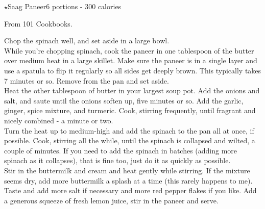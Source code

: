 \begin{recipe}{\texorpdfstring{$\star$}{str}Saag Paneer}{6 portions - 300 calories}{}

\freeform From 101 Cookbooks.


Chop the spinach well, and set aside in a large bowl.\\

While you're chopping spinach, cook the paneer in one tablespoon of the butter over medium heat in a large skillet. Make sure the paneer is in a single layer and use a spatula to flip it regularly so all sides get deeply brown. This typically takes 7 minutes or so. Remove from the pan and set aside.\\

Heat the other tablespoon of butter in your largest soup pot. Add the onions and salt, and saute until the onions soften up, five minutes or so. Add the garlic, ginger, spice mixture, and turmeric. Cook, stirring frequently, until fragrant and nicely combined - a minute or two.\\

Turn the heat up to medium-high and add the spinach to the pan all at once, if possible. Cook, stirring all the while, until the spinach is collapsed and wilted, a couple of minutes. If you need to add the spinach in batches (adding more spinach as it collapses), that is fine too, just do it as quickly as possible.\\

Stir in the buttermilk and cream and heat gently while stirring. If the mixture seems dry, add more buttermilk a splash at a time (this rarely happens to me). Taste and add more salt if necessary and more red pepper flakes if you like. Add a generous squeeze of fresh lemon juice, stir in the paneer and serve.

\end{recipe}